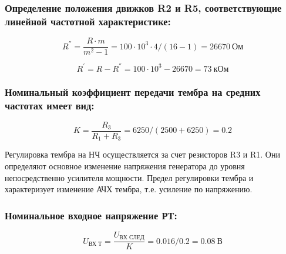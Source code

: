 \subsubsection{ Определение положения движков R2 и R5, соответствующие линейной частотной характеристике:}

  \begin{equation}
  \label{eq:equation5_16}
  R^{''}=\dfrac{R \cdot m}{m^2-1}=100 \cdot 10^3 \cdot  4/(16-1)=26670~\text{Ом}
  \end{equation}

  \begin{equation}
  \label{eq:equation5_17}
  R^{'}=R-R^{''}=100 \cdot 10^3 -26670=73~\text{кОм}
  \end{equation}

  \subsubsection{ Номинальный коэффициент передачи тембра на средних частотах имеет вид:}
   
  \begin{equation}
  \label{eq:equation5_18}
   K=\dfrac {R_3}{R_1+R_3}=6250/(2500+6250)=0.2
  \end{equation}

  Регулировка тембра на НЧ осуществляется за счет резисторов R3 и R1. Они определяют основное изменение напряжения генератора до уровня непосредственно усилителя мощности. Предел регулировки тембра и характеризует изменение АЧХ тембра, т.е. усиление по напряжению.

  \subsubsection{  Номинальное входное напряжение РТ:}

  \begin{equation}
  \label{eq:equation5_19}
   U_{\text{ВХ Т}}=\dfrac{U_{\text{ВХ СЛЕД}}}{K}=0.016/0.2=0.08~\text{В}
  \end{equation}


   